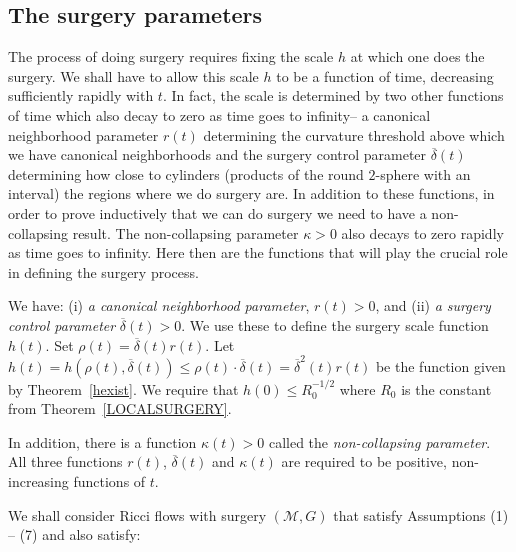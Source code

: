 \subsection{The surgery parameters}

The process of doing surgery requires fixing the scale $h$ at which one does
the surgery. We shall have to allow this scale $h$ to be a function of time,
decreasing sufficiently rapidly with $t$. In fact, the scale is determined by
two other functions of time which also decay to zero as time goes to infinity--
a canonical neighborhood parameter $r(t)$ determining the curvature threshold
above which we have canonical neighborhoods and the surgery control parameter
$\overline\delta(t)$ determining how close to cylinders (products of the round $2$-sphere
with an interval) the regions where we do
surgery are. In addition to these functions, in order to prove inductively that
we can do surgery we need to have a non-collapsing result. The non-collapsing
parameter $\kappa>0$ also decays to zero rapidly as time goes to infinity.
Here then are the functions that will play the crucial role in defining
the surgery process.


\begin{definition}
\label{def:surgery-scale-function}
\label{hrestricted}
We have: (i) {\em a canonical neighborhood parameter},
 $r(t)>0$, and
(ii) {\em a surgery control parameter} $\overline\delta(t)>0$. We use these
to define the surgery scale function $h(t)$. Set
$\rho(t)=\overline\delta(t)r(t)$. Let $h(t)=
h(\rho(t),\overline\delta(t))\le
\rho(t)\cdot\overline\delta(t)=\overline\delta^2(t)r(t)$ be the
function given by Theorem~\ref{hexist}. We require that $h(0)\le
R_0^{-1/2}$ where $R_0$ is the constant from
Theorem~\ref{LOCALSURGERY}.

 In addition, there is a
function $\kappa(t)>0$ called the {\em non-collapsing parameter}.
All three functions $r(t)$, $\overline\delta(t)$ and $\kappa(t)$ are
required to  be  positive,  non-increasing functions of $t$.
\end{definition}






We shall consider Ricci flows with surgery $({\mathcal M},G)$ that
satisfy Assumptions (1) -- (7) and also satisfy:








